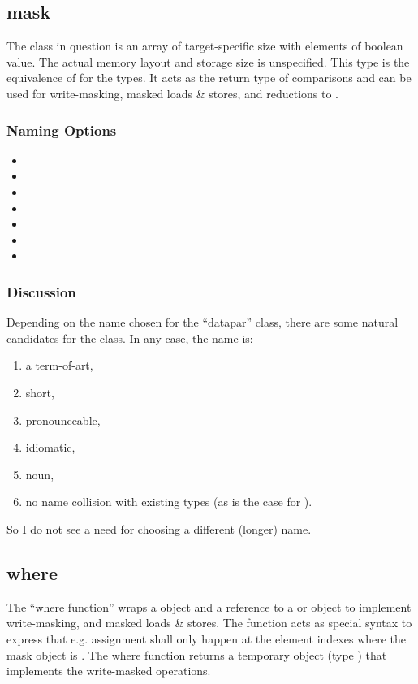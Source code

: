 \subsection{mask}

The class in question is an array of target-specific size with elements of boolean value.
The actual memory layout and storage size is unspecified.
This type is the equivalence of  for the  types.
It acts as the return type of  comparisons and can be used for write-masking, masked loads \& stores, and reductions to .

\subsubsection{Naming Options}

\begin{itemize}
  \item {}
  \item {}
  \item {}
  \item {}
  \item {}
  \item {}
  \item {}
\end{itemize}

\subsubsection{Discussion}

Depending on the name chosen for the “datapar” class, there are some natural candidates for the  class.
In any case, the  name is:
\begin{enumerate}
  \item a term-of-art,
  \item short,
  \item pronounceable,
  \item idiomatic,
  \item noun,
  \item no name collision with existing types (as is the case for ).
\end{enumerate}
So I do not see a need for choosing a different (longer) name.

\subsection{where}
The “where function” wraps a  object and a reference to a  or  object to implement write-masking, and masked loads \& stores.
The function acts as special syntax to express that e.g. assignment shall only happen at the element indexes where the mask object is .
The where function returns a temporary object (type ) that implements the write-masked operations.

